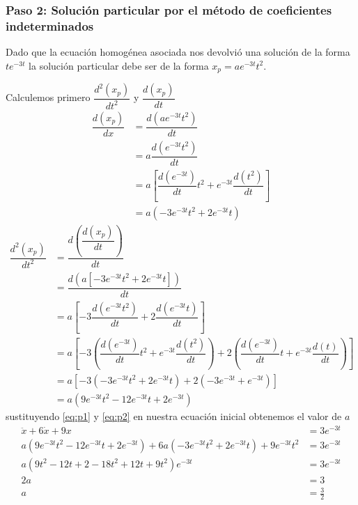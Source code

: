     \subsubsection*{Paso 2: Solución particular por el método de coeficientes indeterminados}
        Dado que la ecuación homogénea asociada nos devolvió una solución de la forma $t e^{-3 t}$ la solución particular debe ser de
        la forma $x_p = a e^{-3 t} t^2 $.

        Calculemos primero $\dfrac{d^2(x_p)}{dt^2}$ y $\dfrac{d(x_p)}{dt}$
        \begin{equation}
            \begin{split}
                \dfrac{d(x_p)}{dx} & = \dfrac{d(a e^{-3 t} t^2)}{dt}\\
                & = a \dfrac{d(e^{-3 t} t^2)}{dt} \\
                & = a\left[\dfrac{d(e^{-3 t})}{dt}t^2 + e^{-3t}\dfrac{d(t^2)}{dt}\right] \\
                & = a(-3e^{-3t}t^2 + 2e^{-3t}t)
            \end{split}
            \label{eq:p1}
        \end{equation}
        \begin{equation}
            \begin{split}
                \dfrac{d^2(x_p)}{dt^2} & = \dfrac{d(\dfrac{d(x_p)}{dt})}{dt} \\
                & = \dfrac{d(a[-3e^{-3t}t^2 + 2e^{-3t}t])}{dt} \\
                & = a\left[-3\dfrac{d(e^{-3t}t^2)}{dt} + 2\dfrac{d(e^{-3t}t)}{dt}\right] \\
                & = a\left[-3(\dfrac{d(e^{-3 t})}{dt}t^2 + e^{-3t}\dfrac{d(t^2)}{dt}) + 2(\dfrac{d(e^{-3t})}{dt}t+e^{-3t}\dfrac{d(t)}{dt})\right] \\
                & = a\left[-3(-3e^{-3t}t^2 + 2e^{-3t}t)+ 2(-3e^{-3t}+e^{-3t})\right] \\
                & = a(9e^{-3t}t^2 - 12e^{-3t}t + 2e^{-3t})
            \end{split}
            \label{eq:p2}
        \end{equation}
        sustituyendo \eqref{eq:p1} y \eqref{eq:p2} en nuestra ecuación inicial obtenemos el valor de $a$
        \begin{equation*}
            \begin{split}
                \ddot{x} + 6\dot{x} + 9x & = 3e^{-3t} \\
                a(9e^{-3t}t^2 - 12e^{-3t}t + 2e^{-3t}) + 6a(-3e^{-3t}t^2 + 2e^{-3t}t) + 9e^{-3t}t^2 & = 3e^{-3t} \\
                a(9t^2 - 12t + 2 -18t^2 + 12t + 9t^2)e^{-3t} & = 3e^{-3t} \\
                2a & = 3 \\
                a & = \frac{3}{2}
            \end{split}
        \end{equation*}
